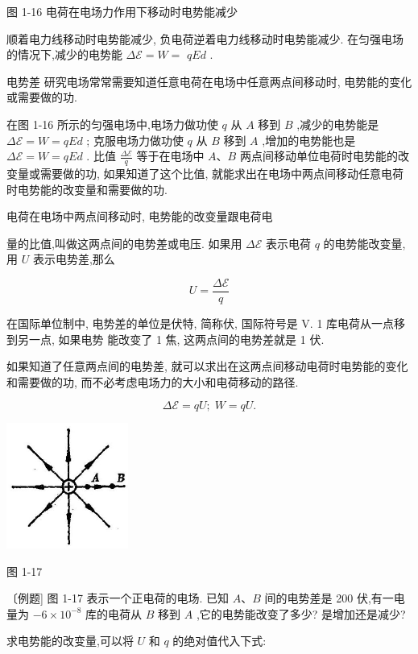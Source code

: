 \documentclass[10pt]{article}
\begin{document}
图 1-16 电荷在电场力作用下移动时电势能减少

顺着电力线移动时电势能减少, 负电荷逆着电力线移动时电势能减少. 在匀强电场的情况下,减少的电势能 \(\Delta \mathcal{E} = W =\) \({qEd}\) .

电势差 研究电场常常需要知道任意电荷在电场中任意两点间移动时, 电势能的变化或需要做的功.

在图 1-16 所示的匀强电场中,电场力做功使 \(q\) 从 \(A\) 移到 \(B\) ,减少的电势能是 \(\Delta \mathcal{E} = W = {qEd}\) ; 克服电场力做功使 \(q\) 从 \(B\) 移到 \(A\) ,增加的电势能也是 \(\Delta \mathcal{E} = W = {qEd}\) . 比值 \(\frac{\Delta \mathcal{E}}{q}\) 等于在电场中 \(A\text{、}B\) 两点间移动单位电荷时电势能的改变量或需要做的功, 如果知道了这个比值, 就能求出在电场中两点间移动任意电荷时电势能的改变量和需要做的功.

电荷在电场中两点间移动时, 电势能的改变量跟电荷电

量的比值,叫做这两点间的电势差或电压. 如果用 \(\Delta \mathcal{E}\) 表示电荷 \(q\) 的电势能改变量,用 \(U\) 表示电势差,那么

\[
U = \frac{\Delta \mathcal{E}}{q}
\]

在国际单位制中, 电势差的单位是伏特, 简称伏, 国际符号是 V. 1 库电荷从一点移到另一点, 如果电势 能改变了 1 焦, 这两点间的电势差就是 1 伏.

如果知道了任意两点间的电势差, 就可以求出在这两点间移动电荷时电势能的变化和需要做的功, 而不必考虑电场力的大小和电荷移动的路径.

\[
\Delta \mathcal{E} = {qU};\;W = {qU}.
\]

\begin{center}
\includegraphics[max width=0.3\textwidth]{images/01913056-1f15-74d8-9184-9aab52c9d66b_30_144568.jpg}
\end{center}

图 1-17

〔例题] 图 1-17 表示一个正电荷的电场. 已知 \(A\text{、}B\) 间的电势差是 200 伏,有一电量为 \(- 6 \times {10}^{-8}\) 库的电荷从 \(B\) 移到 \(A\) ,它的电势能改变了多少? 是增加还是减少?

求电势能的改变量,可以将 \(U\) 和 \(q\) 的绝对值代入下式:
\end{document}
